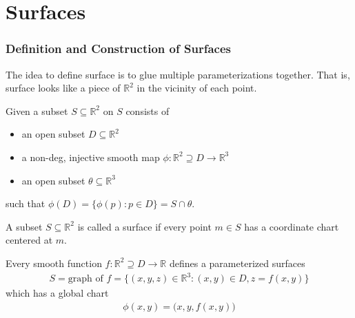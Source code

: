 \documentclass[10pt]{article}
\begin{document}
    \newpage
    \part{Surfaces}\label{Part:Surfaces}
    
        \section{Definition and Construction of Surfaces}
            The idea to define surface is to glue multiple parameterizations together. That is, surface looks like a piece of $\mathbb{R}^2$ in the vicinity of each point.

            \begin{definition}
                Given a subset $S\subseteq\mathbb{R}^2$ on $S$ consists of
                \begin{itemize}
                    \item an open subset $D\subseteq\mathbb{R}^2$
                    \item a non-deg, injective smooth map $\phi:\mathbb{R}^2\supseteq D\rightarrow\mathbb{R}^3$
                    \item an open subset $\theta\subseteq\mathbb{R}^3$
                \end{itemize}
                such that $\phi(D) = \{ \phi(p): p\in D \} = S\cap\theta$.
            \end{definition}

            \begin{definition}[Surface]
                A subset $S\subseteq\mathbb{R}^2$ is called a surface if every point $m\in S$ has a coordinate chart centered at $m$.
            \end{definition}
        
            \begin{definition}[Graph]
                Every smooth function $f: \mathbb{R}^2\supseteq D\rightarrow\mathbb{R}$ defines a parameterized surfaces 
                \begin{equation*}
                    \begin{aligned}
                        S = \text{graph of } f = \big\{ (x,y,z)\in\mathbb{R}^3: (x,y)\in D, z=f(x,y) \big\}
                    \end{aligned}
                \end{equation*}
                which has a global chart
                \begin{equation*}
                    \begin{aligned}
                        \phi(x,y)  = \big(x,y,f(x,y)\big)
                    \end{aligned}
                \end{equation*}
            \end{definition}
\end{document}
